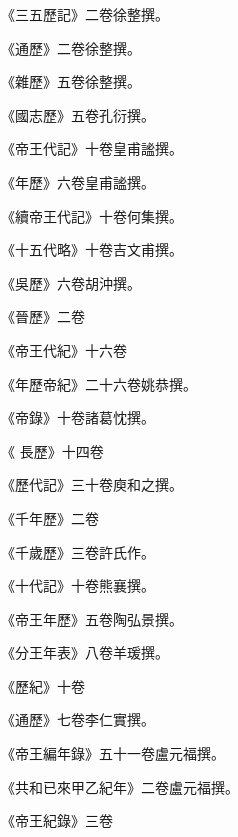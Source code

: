 \begin{pinyinscope}
 《三五歷記》二卷徐整撰。



 《通歷》二卷徐整撰。



 《雜歷》五卷徐整撰。



 《國志歷》五卷孔衍撰。



 《帝王代記》十卷皇甫謐撰。



 《年歷》六卷皇甫謐撰。



 《續帝王代記》十卷何集撰。



 《十五代略》十卷吉文甫撰。



 《吳歷》六卷胡沖撰。



 《晉歷》二卷



 《帝王代紀》十六卷



 《年歷帝紀》二十六卷姚恭撰。



 《帝錄》十卷諸葛忱撰。



 《
 長歷》十四卷



 《歷代記》三十卷庾和之撰。



 《千年歷》二卷



 《千歲歷》三卷許氏作。



 《十代記》十卷熊襄撰。



 《帝王年歷》五卷陶弘景撰。



 《分王年表》八卷羊瑗撰。



 《歷紀》十卷



 《通歷》七卷李仁實撰。



 《帝王編年錄》五十一卷盧元福撰。



 《共和已來甲乙紀年》二卷盧元福撰。



 《帝王紀錄》三卷




\end{pinyinscope}
